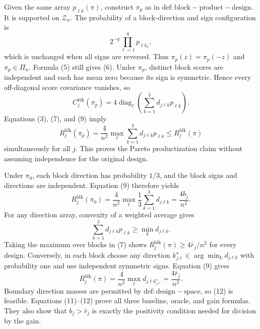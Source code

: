 Given the same array \(p_{\ell k}(\pi)\), construct \(\pi_p\) as in \(\mathrm{def:block-product-design}\). It is supported on \(\mathcal Z_n\). The probability of a block-direction and sign configuration is
\[
2^{-q}\prod_{\ell=1}^qp_{\ell k_\ell},
\tag{8}
\]
which is unchanged when all signs are reversed. Thus \(\pi_p(z)=\pi_p(-z)\) and \(\pi_p\in\Pi_n\). Formula (5) still gives (6). Under \(\pi_p\), distinct block scores are independent and each has mean zero because its sign is symmetric. Hence every off-diagonal score covariance vanishes, so
\[
C_j^{\mathrm{blk}}(\pi_p)
=4\operatorname{diag}_{\ell}
\left(\sum_{k=1}^3d_{j\ell k}p_{\ell k}\right).
\tag{9}
\]
Equations (3), (7), and (9) imply
\[
R_j^{\mathrm{blk}}(\pi_p)
=\frac4{n^2}\max_\ell\sum_{k=1}^3d_{j\ell k}p_{\ell k}
\le R_j^{\mathrm{blk}}(\pi)
\tag{10}
\]
simultaneously for all \(j\). This proves the Pareto productization claim without assuming independence for the original design.

Under \(\pi_0\), each block direction has probability \(1/3\), and the block signs and directions are independent. Equation (9) therefore yields
\[
R_j^{\mathrm{blk}}(\pi_0)
=\frac4{n^2}\max_\ell\frac13\sum_{k=1}^3d_{j\ell k}
=\frac{4b_j}{n^2}.
\tag{11}
\]
For any direction array, convexity of a weighted average gives
\[
\sum_{k=1}^3d_{j\ell k}p_{\ell k}
\ge\min_kd_{j\ell k}.
\]
Taking the maximum over blocks in (7) shows \(R_j^{\mathrm{blk}}(\pi)\ge4\bar r_j/n^2\) for every design. Conversely, in each block choose any direction \(k_{j\ell}^\star\in\arg\min_kd_{j\ell k}\) with probability one and use independent symmetric signs. Equation (9) gives
\[
R_j^{\mathrm{blk}}(\pi)
=\frac4{n^2}\max_\ell d_{j\ell k_{j\ell}^\star}
=\frac{4\bar r_j}{n^2}.
\tag{12}
\]
Boundary direction masses are permitted by \(\mathrm{def:design-space}\), so (12) is feasible. Equations (11)--(12) prove all three baseline, oracle, and gain formulas. They also show that \(b_j>\bar r_j\) is exactly the positivity condition needed for division by the gain.

